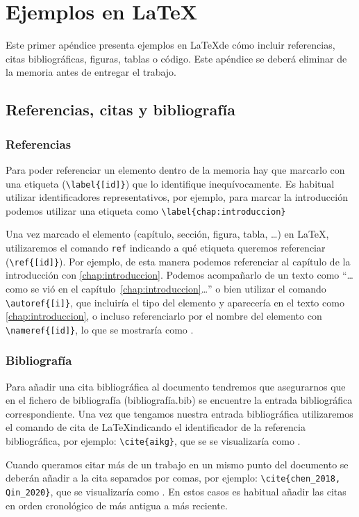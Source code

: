 \chapter{Ejemplos en \LaTeX}

Este primer apéndice presenta ejemplos en \LaTeX de cómo incluir referencias, citas bibliográficas, figuras, tablas o código. Este apéndice se deberá eliminar de la memoria antes de entregar el trabajo. 

\section{Referencias, citas y bibliografía}
\subsection{Referencias}
Para poder referenciar un elemento dentro de la memoria hay que marcarlo con una etiqueta (\verb|\label{[id]}|) que lo identifique inequívocamente. Es habitual utilizar identificadores  representativos, por ejemplo, para marcar la introducción podemos utilizar una etiqueta como \verb|\label{chap:introduccion}|

Una vez marcado el elemento (capítulo, sección, figura, tabla, \ldots) en \LaTeX, utilizaremos el comando \verb|ref| indicando a qué etiqueta queremos referenciar (\verb|\ref{[id]}|). Por ejemplo, de esta manera podemos referenciar al capítulo de la introducción con \ref{chap:introduccion}. Podemos acompañarlo de un texto como ``\ldots como se vió en el capítulo~\ref{chap:introduccion}\ldots'' o bien utilizar el comando \verb|\autoref{[i]}|, que incluiría el tipo del elemento y aparecería en el texto como \autoref{chap:introduccion}, o incluso referenciarlo por el nombre del elemento con \verb|\nameref{[id]}|, lo que se mostraría como . 

\subsection{Bibliografía}
Para añadir una cita bibliográfica al documento tendremos que asegurarnos que en el fichero de bibliografía (bibliografía.bib) se encuentre la entrada bibliográfica correspondiente. Una vez que tengamos nuestra entrada bibliográfica utilizaremos el comando de cita de \LaTeX indicando el identificador de la referencia bibliográfica, por ejemplo: 
\verb|\cite{aikg}|, que se se visualizaría como \cite{aikg}. 

Cuando queramos citar más de un trabajo en un mismo punto del documento se deberán añadir a la cita separados por comas, por ejemplo: \verb|\cite{chen_2018, Qin_2020}|, que se visualizaría como \cite{chen_2018, Qin_2020}. En estos casos es habitual añadir las citas en orden cronológico de más antigua a más reciente.

